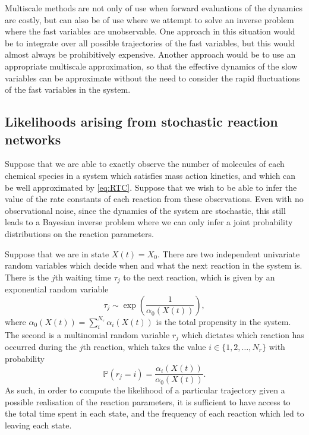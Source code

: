 \documentclass[final]{siamltex}
\begin{document}
Multiscale methods are not only of use when forward evaluations of the
dynamics are costly, but can also be of use where we attempt to solve
an inverse problem where the fast variables are unobservable. One
approach in this situation would be to integrate over all possible
trajectories of the fast variables, but this would almost always be
prohibitively expensive. Another approach would be to use an
appropriate multiscale approximation, so that the effective dynamics
of the slow variables can be approximate without the need to consider
the rapid fluctuations of the fast variables in the system.

\subsection{Likelihoods arising from stochastic reaction networks}
Suppose that we are able to exactly observe the number of molecules of
each chemical species in a system which satisfies mass action
kinetics, and which can be well approximated by
\eqref{eq:RTC}. Suppose that we wish to be able to infer the value of
the rate constants of each reaction from these observations. Even with no observational noise, since the dynamics
of the system are stochastic, this still leads to a Bayesian inverse
problem where we can only infer a joint probability distributions on the
reaction parameters.

Suppose that we are in state $X(t) = X_0$. There are two independent
univariate random variables which decide when and what the next
reaction in the system is. There is the $j$th waiting time $\tau_j$ to the
next reaction, which is given by an exponential random variable
\[\tau_j \sim \exp \left ( \frac{1}{\alpha_0(X(t))} \right ),\]
where $\alpha_0(X(t)) =\sum_{i}^{N_r} \alpha_i(X(t))$ is the total
propensity in the system. The second is a multinomial random variable $r_j$
which dictates which reaction has occurred during the $j$th reaction,
which takes the value
$i \in \{1,2,\ldots,N_r\}$ with probability
\[\mathbb{P}(r_j = i) = \frac{\alpha_i(X(t))}{\alpha_0(X(t))}.\]
As such, in order to compute the likelihood of a particular trajectory
given a possible realisation of the reaction parameters, it is
sufficient to have access to the total time spent in each state, and
the frequency of each reaction which led to leaving each state.
\end{document}
